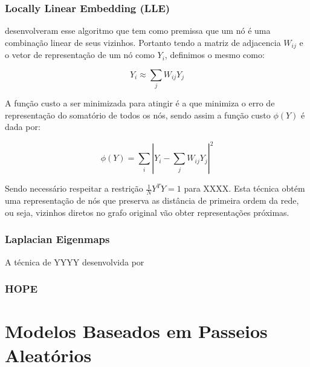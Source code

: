 \subsubsection{Locally Linear Embedding (LLE)}

\citet{roweis00} desenvolveram esse algoritmo que tem como premissa que um nó é
uma combinação linear de seus vizinhos.
Portanto tendo a matriz de adjacencia $W_{ij}$ e o vetor de representação de um
nó como $Y_i$, definimos o mesmo como:

\begin{equation}
    Y_i \approx \sum_j{W_{ij}Y_j}
\end{equation}

A função custo a ser minimizada para atingir é a que minimiza o erro de
representação do somatório de todos os nós, sendo assim a função custo $\phi(Y)$
é dada por:

\begin{equation}
    \phi(Y) = \sum_i{|Y_i - \sum_j{W_{ij}Y_j}|^2}
\end{equation}

Sendo necessário respeitar a restrição $\frac{1}{N}Y^TY = 1$ para XXXX.
Esta técnica obtém uma representação de nós que preserva as distância de
primeira ordem da rede, ou seja, vizinhos diretos no grafo original vão obter
representações próximas.

\subsubsection{Laplacian Eigenmaps}

A técnica de YYYY desenvolvida por \citet{belkin02}

\subsubsection{HOPE}

\section{Modelos Baseados em Passeios Aleatórios}


